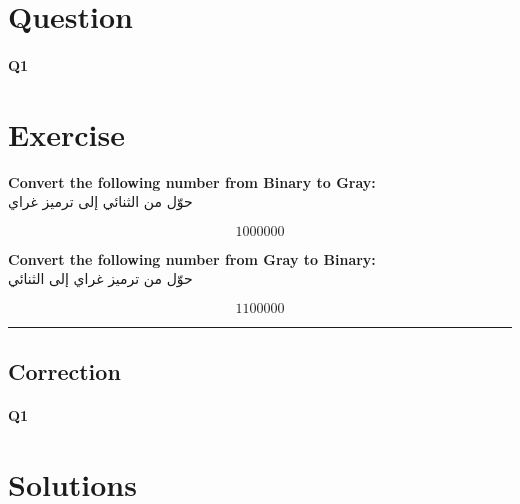 
\section{Question}


\paragraph{Q1}











\section*{Exercise}

\textbf{Convert the following number from Binary to Gray:}\\
حوّل من الثنائي إلى ترميز غراي

\[
  1000000
\]

\bigskip

\textbf{Convert the following number from Gray to Binary:}\\
حوّل من ترميز غراي إلى الثنائي

\[
  1100000
\]




\hrule width 1\linewidth
\pagebreak

\subsection{Correction}


\paragraph{Q1}











\section*{Solutions}

